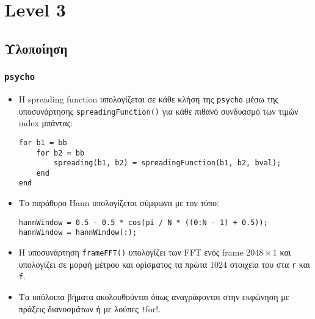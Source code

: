 \section{Level 3}
\subsection{Υλοποίηση}
\subsubsection{\texttt{psycho}}
\begin{itemize}
\item Η spreading function υπολογίζεται σε κάθε κλήση της \texttt{psycho} μέσω της υποσυνάρτησης \texttt{spreadingFunction()} για κάθε πιθανό συνδυασμό των τιμών index μπάντας:
\begin{verbatim}
for b1 = bb
    for b2 = bb
        spreading(b1, b2) = spreadingFunction(b1, b2, bval);
    end
end
\end{verbatim}

\item Το παράθυρο Hann υπολογίζεται σύμφωνα με τον τύπο:
\begin{verbatim}
hannWindow = 0.5 - 0.5 * cos(pi / N * ((0:N - 1) + 0.5));
hannWindow = hannWindow(:);
\end{verbatim}

\item Η υποσυνάρτηση \texttt{frameFFT()} υπολογίζει των FFT ενός frame $2048 \times 1$ και υπολογίζει σε μορφή μέτρου και ορίσματος τα πρώτα $1024$ στοιχεία του στα \texttt{r} και \texttt{f}.

\item Τα υπόλοιπα βήματα ακολουθούνται όπως αναγράφονται στην εκφώνηση με πράξεις διανυσμάτων ή με λούπες \texttt!for!.
\end{itemize}

